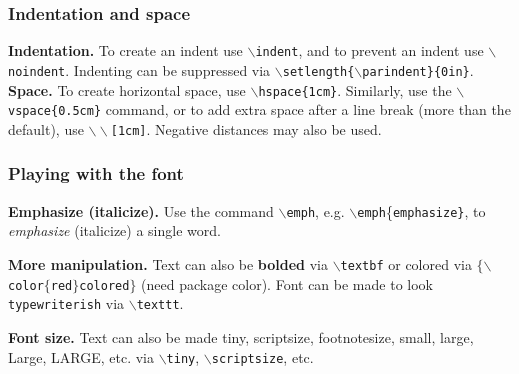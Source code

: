 \documentclass[slidestop,compress,mathserif]{beamer}
\begin{document}
\begin{frame} \frametitle{Indentation and space}
{\bf Indentation. } To create an indent use \texttt{\color{command}$\backslash$indent}, and to prevent an indent use \texttt{\color{command}$\backslash$noindent}. Indenting can be suppressed via \texttt{\color{command}$\backslash$setlength}\texttt{\color{braces}\{}\texttt{\color{command}$\backslash$parindent}\texttt{\color{braces}\}}\texttt{\color{braces}\{}\texttt{0in}\texttt{\color{braces}\}}. \\
\vspace{0.7cm}
{\bf Space. } To create horizontal\hspace{1cm} space, use \texttt{\color{command}$\backslash$hspace}\texttt{\color{braces}\{}\texttt{1cm}\texttt{\color{braces}\}}. Similarly, use the \texttt{\color{command}$\backslash$vspace}\texttt{\color{braces}\{}\texttt{0.5cm}\texttt{\color{braces}\}} command, or to add extra space after a line break (more than the default), use \texttt{{\color{command}$\backslash\backslash$}[1cm]}. Negative distances may also be used. %
\end{frame}

\begin{frame} \frametitle{Playing with the font}
{\bf Emphasize (italicize). } Use the command \texttt{\color{command}$\backslash$emph}, e.g. \texttt{\color{command}$\backslash$emph}{\color{braces}\{}\texttt{emphasize\color{braces}\}}, to \emph{emphasize} (italicize) a single word. \\
\vspace{0.7cm}

{\bf More manipulation. } Text can also be \textbf{bolded} via \texttt{\color{command}$\backslash$textbf} or {\color{red} colored} via \texttt{\color{braces}$\{$\color{command}$\backslash$color\color{braces}$\{$\color{black}red\color{braces}$\}$\color{black}colored\color{braces}$\}$} (need package {\color{highlight}color}). Font can be made to look \texttt{typewriterish} via \texttt{\color{command}$\backslash$texttt}. \\
\vspace{0.7cm}

{\bf Font size. } Text can also be made {\tiny tiny}, {\scriptsize scriptsize}, {\footnotesize footnotesize}, {\small small}, {\large large}, {\Large Large}, {\LARGE LARGE}, etc. via \texttt{\color{command}$\backslash$tiny}, \texttt{\color{command}$\backslash$scriptsize}, etc.
\end{frame}
\end{document}
